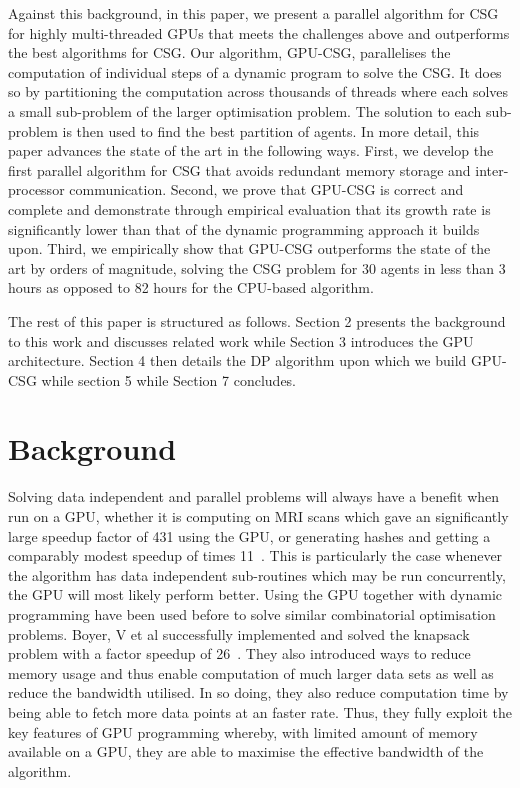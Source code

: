 \documentclass{llncs}
\begin{document}
Against this background, in this paper, we present a parallel algorithm for CSG for highly multi-threaded GPUs that meets the challenges above and outperforms the best algorithms for CSG. Our algorithm, GPU-CSG, parallelises the computation of individual steps of a dynamic program to solve the CSG. It does so by partitioning the computation across thousands of threads where each solves a small sub-problem of the larger optimisation problem. The solution to each sub-problem is then used to find the best partition of agents. In more detail, this paper advances the state of the art in the following ways. First, we develop the first parallel  algorithm for CSG that avoids redundant memory storage and inter-processor communication. Second, we prove that GPU-CSG is correct and complete and demonstrate through empirical evaluation that its growth rate is significantly lower than that of the dynamic programming approach it builds upon. Third, we empirically show that GPU-CSG outperforms the state of the art by orders of magnitude, solving the CSG problem for 30 agents in less than 3 hours as opposed to 82 hours for the CPU-based algorithm.

The rest of this paper is structured as follows. Section 2 presents the
background to this work and discusses related work while Section 3 introduces
the GPU architecture. Section 4 then details the DP algorithm upon which we build GPU-CSG
while section 5 while Section 7 concludes.

\section{Background}
Solving data independent and parallel problems will always have a benefit when run on a GPU, 
whether it is computing on MRI scans which gave an significantly large speedup factor of 431 using the GPU, or generating hashes and getting a comparably modest speedup of times 11~\cite{ryoo2008optimization}.  This is particularly the case whenever the algorithm has data independent sub-routines which may be run concurrently, the GPU will most likely perform better.  Using the GPU together with dynamic programming have been used before to solve similar combinatorial optimisation problems.  Boyer, V et al successfully implemented and solved the knapsack problem with a factor speedup of 26~\cite{boyer2012solving}.  They also introduced ways to reduce memory usage and thus enable computation of much larger data sets as well as reduce the  bandwidth utilised. In so doing, they also reduce computation time by being able to fetch more data points at an faster rate. Thus, they fully exploit the key features of GPU programming whereby, with limited amount of memory available on a GPU,  they are able to maximise the effective bandwidth of the algorithm.
\end{document}
